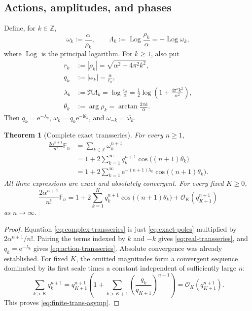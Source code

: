\documentclass[11pt,a4paper]{article}
\newtheorem{theorem}{Theorem}[section]
\theoremstyle{definition}
\theoremstyle{remark}
\newcommand{\Fub}{\mathsf F}
\newcommand{\e}{\mathrm e}
\newcommand{\ii}{\mathrm i}
\newcommand{\Log}{\operatorname{Log}}
\newcommand{\cO}{\mathcal O}
\newcommand{\abs}[1]{\left|#1\right|}
\newcommand{\Z}{\mathbb Z}
\begin{document}
\subsection{Actions, amplitudes, and phases}

Define, for \(k\in\Z\),
\begin{equation}\label{eq:omega-lambda}
 \omega_k:=\frac{\alpha}{\rho_k},
 \qquad
 \Lambda_k:=\Log\frac{\rho_k}{\alpha}=-\Log\omega_k,
\end{equation}
where \(\Log\) is the principal logarithm.  For \(k\ge1\), also put
\begin{align}
 r_k&:=\abs{\rho_k}=\sqrt{\alpha^2+4\pi^2k^2},
 \label{eq:rk}\\
 q_k&:=\abs{\omega_k}=\frac{\alpha}{r_k},
 \label{eq:qk}\\
 \lambda_k&:=\Re\Lambda_k
 =\log\frac{r_k}{\alpha}
 =\frac12\log\left(1+\frac{4\pi^2k^2}{\alpha^2}\right),
 \label{eq:lambdak}\\
 \theta_k&:=\arg\rho_k
 =\arctan\frac{2\pi k}{\alpha}.
 \label{eq:thetak}
\end{align}
Then \(q_k=\e^{-\lambda_k}\),
\(
 \omega_k=q_k\e^{-\ii\theta_k}
\), and
\(
 \omega_{-k}=\overline{\omega_k}
\).

\begin{theorem}[Complete exact transseries]\label{thm:complete-transseries}
For every \(n\ge1\),
\begin{align}
 \frac{2\alpha^{n+1}}{n!}\Fub_n
 &=\sum_{k\in\Z}\omega_k^{n+1}
 \label{eq:complex-transseries}\\
 &=1+2\sum_{k=1}^{\infty}
 q_k^{n+1}\cos\bigl((n+1)\theta_k\bigr)
 \label{eq:real-transseries}\\
 &=1+2\sum_{k=1}^{\infty}
 \e^{-(n+1)\lambda_k}
 \cos\bigl((n+1)\theta_k\bigr).
 \label{eq:action-transseries}
\end{align}
All three expressions are exact and absolutely convergent.
For every fixed \(K\ge0\),
\begin{equation}\label{eq:finite-trans-asymp}
 \frac{2\alpha^{n+1}}{n!}\Fub_n
 =1+2\sum_{k=1}^{K}q_k^{n+1}
       \cos\bigl((n+1)\theta_k\bigr)
  +\cO_K\!\left(q_{K+1}^{n+1}\right)
\end{equation}
as \(n\to\infty\).
\end{theorem}

\begin{proof}
Equation \eqref{eq:complex-transseries} is just
\eqref{eq:exact-poles} multiplied by \(2\alpha^{n+1}/n!\).
Pairing the terms indexed by \(k\) and \(-k\) gives
\eqref{eq:real-transseries}, and \(q_k=\e^{-\lambda_k}\) gives
\eqref{eq:action-transseries}.  Absolute convergence was already established.
For fixed \(K\), the omitted magnitudes form a convergent sequence dominated by
its first scale times a constant independent of sufficiently large \(n\):
\[
 \sum_{k>K}q_k^{n+1}
 =q_{K+1}^{n+1}
   \left(1+\sum_{k>K+1}
   \left(\frac{q_k}{q_{K+1}}\right)^{n+1}\right)
 =\cO_K(q_{K+1}^{n+1}).
\]
This proves \eqref{eq:finite-trans-asymp}.
\end{proof}
\end{document}
